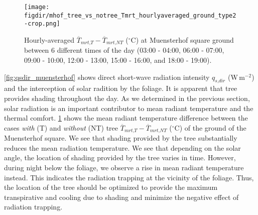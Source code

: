 \begin{figure}[t]
	\centering
	\texttt{[image: \\figdir/mhof\_tree\_vs\_notree\_Tmrt\_hourlyaveraged\_ground\_type2-crop.png]}
	\caption{Hourly-averaged $\overline{T}_{\textit{mrt,T}}-\overline{T}_{\textit{mrt,NT}}$ ($^{\circ}$C) at Muensterhof square ground between 6 different times of the day (03:00 - 04:00, 06:00 - 07:00, 09:00 - 10:00, 12:00 - 13:00, 15:00 - 16:00, and 18:00 - 19:00).}
	\label{fig:Tmrtdiff_muensterhof}
\end{figure}

\cref{fig:qsdir_muensterhof} shows direct short-wave radiation intensity $q_{\textit{s,dir}}$ (W\,m$^{-2}$) and the interception of solar radition by the foliage. It is apparent that tree provides shading throughout the day. As we determined in the previous section, solar radiation is an important contributor to mean radiant temperature and the thermal comfort. \cref{fig:Tmrtdiff_muensterhof} shows the mean radiant temperature difference between the cases \textit{with} (T) and \textit{without} (NT) tree $\overline{T}_{\textit{mrt,T}}-\overline{T}_{\textit{mrt,NT}}$ ($^{\circ}$C) of the ground of the Muensterhof square. We see that shading provided by the tree substantially reduces the mean radiation temperature. We see that depending on the solar angle, the location of shading provided by the tree varies in time. However, during night below the foliage, we observe a rise in mean radiant temperature instead. This indicates the radiation trapping at the vicinity of the foliage. Thus, the location of the tree should be optimized to provide the maximum transpirative and cooling due to shading and minimize the negative effect of radiation trapping.

% 


